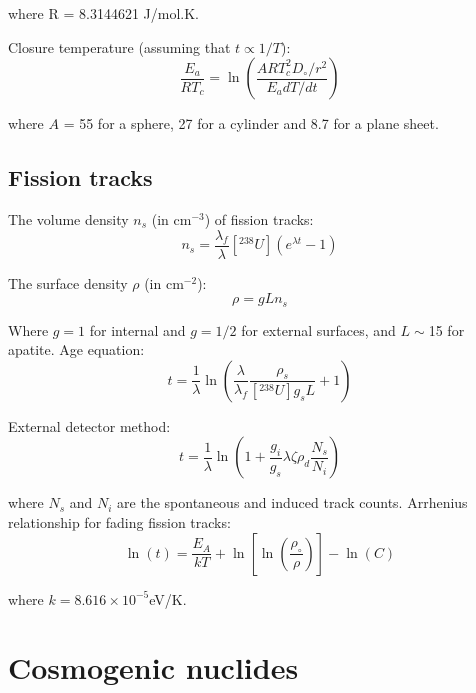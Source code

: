 \documentclass{article}
\begin{document}
\begin{multicols}{3}
where R = 8.3144621 J/mol.K.\medskip

Closure temperature (assuming that $t \propto 1/T$):
\begin{equation}
\frac{E_a}{RT_c} = \ln\left(\frac{ART_c^2D_\circ/r^2}{E_adT/dt}\right)
\label{eq:Tc}
\end{equation}

where $A$ = 55 for a sphere, 27 for a cylinder and 8.7 for a plane
sheet.

\subsection{Fission tracks}
\label{sec:fission-tracks}

The volume density $n_s$ (in cm$^{-3}$) of fission tracks:
\begin{equation}
n_{s} = \frac{\lambda_f}{\lambda} [^{238}U] \left(e^{\lambda t}-1\right)
\label{eq:Ns}
\end{equation}

The surface density $\rho$ (in cm$^{-2}$):
\begin{equation}
\rho = g L n_s
\label{eq:rhos}
\end{equation}

Where $g=1$ for internal and $g=1/2$ for external surfaces, and
$L\sim$15 for apatite. Age equation:
\begin{equation}
t = \frac{1}{\lambda}
\ln\left(\frac{\lambda}{\lambda_f}\frac{\rho_s}{[^{238}U] g_s L
}+1\right)
\label{eq:tFT}
\end{equation}

External detector method:
\begin{equation}
t =
\frac{1}{\lambda}\ln\left(1+\frac{g_i}{g_s}\lambda\zeta\rho_d\frac{N_s}{N_i}\right)
\label{eq:tzeta}
\end{equation}

\noindent where $N_s$ and $N_i$ are the spontaneous and induced track
counts. Arrhenius relationship for fading fission tracks:
\begin{equation}
\ln(t) = \frac{E_A}{kT} +
\ln\left[\ln\left(\frac{\rho_\circ}{\rho}\right)\right] - \ln(C)
\label{eq:lnt}
\end{equation}

where $k=8.616\times{10}^{-5}$eV/K.

\section[Cosmogenic Nuclides]{Cosmogenic nuclides}
\label{sec:cosmo}


\end{multicols}
\end{document}
